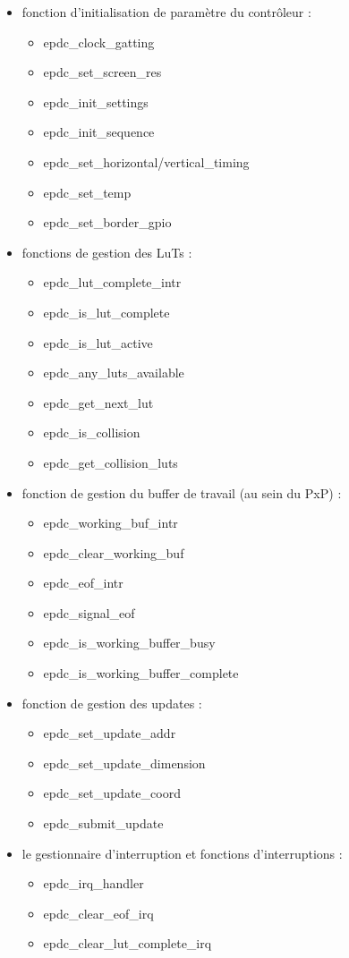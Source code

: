 \begin{itemize}
\renewcommand{\labelitemi}{$\bullet$}
	\item fonction d'initialisation de paramètre du contrôleur : 
		\begin{itemize}
		\renewcommand{\labelitemi}{$\to$}
			\item epdc\_clock\_gatting
			\item epdc\_set\_screen\_res
			\item epdc\_init\_settings
			\item epdc\_init\_sequence
			\item epdc\_set\_horizontal/vertical\_timing
			\item epdc\_set\_temp
			\item epdc\_set\_border\_gpio
		\end{itemize}
	\item fonctions de gestion des LuTs : 
		\begin{itemize}
			\item epdc\_lut\_complete\_intr
			\item epdc\_is\_lut\_complete
			\item epdc\_is\_lut\_active
			\item epdc\_any\_luts\_available
			\item epdc\_get\_next\_lut
			\item epdc\_is\_collision
			\item epdc\_get\_collision\_luts
		\end{itemize}
	\item fonction de gestion du buffer de travail (au sein du PxP) : 
		\begin{itemize}
			\item epdc\_working\_buf\_intr
			\item epdc\_clear\_working\_buf
			\item epdc\_eof\_intr
			\item epdc\_signal\_eof
			\item epdc\_is\_working\_buffer\_busy
			\item epdc\_is\_working\_buffer\_complete
		\end{itemize}
	\item fonction de gestion des updates : 
		\begin{itemize}
			\item epdc\_set\_update\_addr
			\item epdc\_set\_update\_dimension
			\item epdc\_set\_update\_coord
			\item epdc\_submit\_update
		\end{itemize}
	\item le gestionnaire d'interruption et fonctions d'interruptions : 
	\begin{itemize}
		\item epdc\_irq\_handler
		\item epdc\_clear\_eof\_irq
		\item epdc\_clear\_lut\_complete\_irq
	\end{itemize}
\end{itemize}

